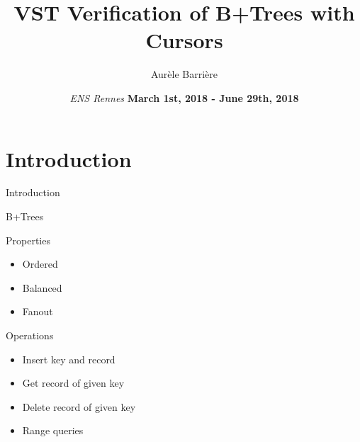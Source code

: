 \documentclass[page number,usenames,dvipsnames]{beamer}
\def\outline{
  \begin{frame}[plain,noframenumbering]
    \frametitle{Outline}
    \tableofcontents[currentsection]
  \end{frame}
}
\begin{document}
\title[shorttitle]{VST Verification of B+Trees with Cursors}

\author[Aur\`ele Barri\`ere]{Aur\`ele Barri\`ere}

\date{\textit{ENS Rennes}
  \vfill
  \textbf{March 1st, 2018 - June 29th, 2018}}

\def\outline{
  \begin{frame}[plain,noframenumbering]
    \frametitle{Outline}
    \tableofcontents[currentsection]
  \end{frame}
}



\begin{frame}
  \vspace{-2cm}
  \maketitle
  \vspace{-4cm}
\end{frame}



\section{Introduction}
\begin{frame}{Introduction}
\end{frame}

\begin{frame}{B+Trees}
  \beforeinsert
  \vfill
  \begin{multicols}{2}
    \begin{exampleblock}{Properties}
      \begin{itemize}
      \item Ordered
      \item Balanced
      \item Fanout
      \end{itemize}
    \end{exampleblock}
      \begin{block}{Operations}
        \begin{itemize}
        \item Insert key and record
        \item Get record of given key
        \item {\color{mDarkRed}Delete record of given key}
        \item Range queries
        \end{itemize}
      \end{block}
  \end{multicols}

\end{frame}
\end{document}
